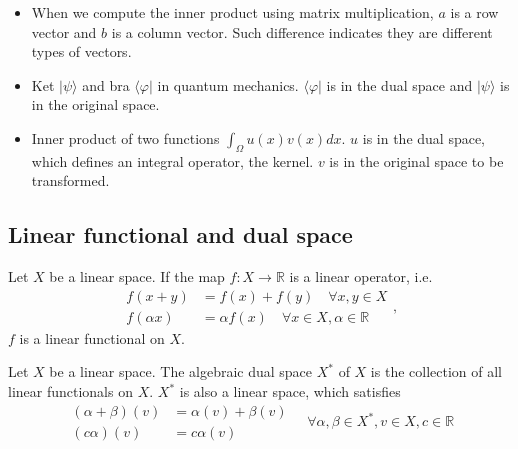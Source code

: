 \documentclass[11pt, a4paper]{book}
\begin{document}
\begin{Example}[Duality]  
  \begin{itemize}
  \item When we compute the inner product using matrix multiplication, $a$ is a row vector
    and $b$ is a column vector. Such difference indicates they are different types of
    vectors.
  \item Ket $|\psi\rangle$ and bra $\langle \varphi |$ in quantum mechanics.
    $\langle \varphi |$ is in the dual space and $|\psi\rangle$ is in the original space.
  \item Inner product of two functions $\int_\Omega u(x)v(x) dx$. $u$ is in the dual space,
    which defines an integral operator, the kernel. $v$ is in the original space to be
    transformed.
  \end{itemize}
\end{Example}

\subsection{Linear functional and dual space}

\begin{Definition}
  \label{def:linear-functional}
  Let $X$ be a linear space. If the map $f: X \rightarrow \mathbb{R}$ is a linear
  operator, i.e.
  $$
  \begin{aligned}
    f(x + y) &= f(x) + f(y) \quad \forall x, y \in X \\
    f(\alpha x) &= \alpha f(x) \quad \forall x \in X, \alpha \in \mathbb{R}
  \end{aligned},
  $$
  $f$ is a linear functional on $X$.
\end{Definition}

\begin{Definition}
  \label{def:alg-dual}
  Let $X$ be a linear space. The algebraic dual space $X^{*}$ of $X$ is the collection of
  all linear functionals on $X$. $X^{*}$ is also a linear space, which satisfies
  \begin{equation*}
    \begin{aligned}
      (\alpha+\beta)(v) &= \alpha(v) + \beta(v) \\
      (c\alpha)(v) &= c\alpha(v)
    \end{aligned}
    \quad \forall \alpha,\beta\in X^{*}, v\in X, c\in \mathbb{R}
  \end{equation*}
\end{Definition}
\end{document}
